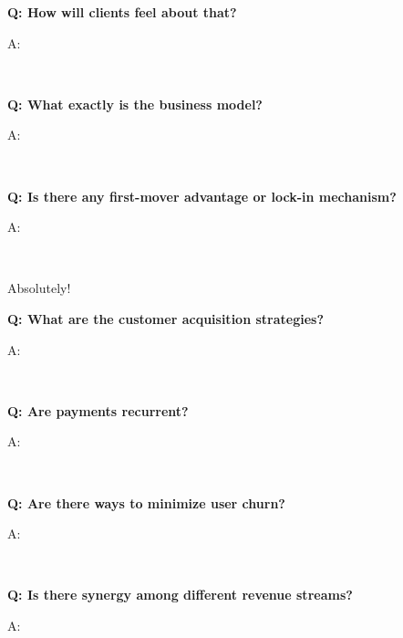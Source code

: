 \documentclass[12pt,a4paper]{article}
\newenvironment{question}[1]{%
  \vspace{0.8em}\noindent\textbf{Q: #1}\par
  \vspace{0.2em}\noindent\begin{itshape}A:\end{itshape}~%
}{\vspace{0.8em}}
\begin{document}
\begin{question}{How will clients feel about that?}
\end{question}

\begin{question}{What exactly is the business model?}
\end{question}

\begin{question}{Is there any first-mover advantage or lock-in mechanism?}
Absolutely!
\end{question}

\begin{question}{What are the customer acquisition strategies?}
\end{question}

\begin{question}{Are payments recurrent?}
\end{question}

\begin{question}{Are there ways to minimize user churn?}
\end{question}

\begin{question}{Is there synergy among different revenue streams?}
\end{question}
\end{document}
